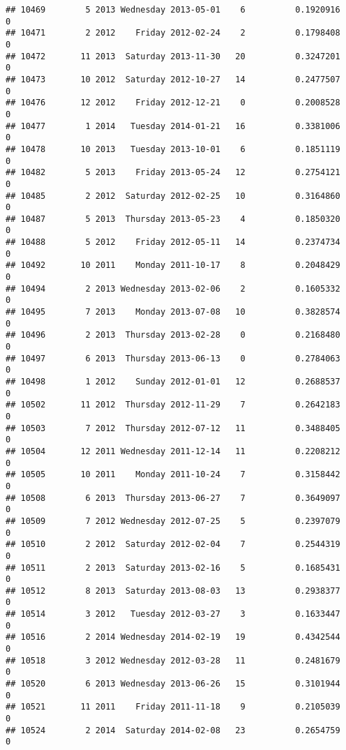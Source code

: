 \documentclass[
]{article}
\begin{document}
\begin{verbatim}
## 10469        5 2013 Wednesday 2013-05-01    6          0.1920916             0
## 10471        2 2012    Friday 2012-02-24    2          0.1798408             0
## 10472       11 2013  Saturday 2013-11-30   20          0.3247201             0
## 10473       10 2012  Saturday 2012-10-27   14          0.2477507             0
## 10476       12 2012    Friday 2012-12-21    0          0.2008528             0
## 10477        1 2014   Tuesday 2014-01-21   16          0.3381006             0
## 10478       10 2013   Tuesday 2013-10-01    6          0.1851119             0
## 10482        5 2013    Friday 2013-05-24   12          0.2754121             0
## 10485        2 2012  Saturday 2012-02-25   10          0.3164860             0
## 10487        5 2013  Thursday 2013-05-23    4          0.1850320             0
## 10488        5 2012    Friday 2012-05-11   14          0.2374734             0
## 10492       10 2011    Monday 2011-10-17    8          0.2048429             0
## 10494        2 2013 Wednesday 2013-02-06    2          0.1605332             0
## 10495        7 2013    Monday 2013-07-08   10          0.3828574             0
## 10496        2 2013  Thursday 2013-02-28    0          0.2168480             0
## 10497        6 2013  Thursday 2013-06-13    0          0.2784063             0
## 10498        1 2012    Sunday 2012-01-01   12          0.2688537             0
## 10502       11 2012  Thursday 2012-11-29    7          0.2642183             0
## 10503        7 2012  Thursday 2012-07-12   11          0.3488405             0
## 10504       12 2011 Wednesday 2011-12-14   11          0.2208212             0
## 10505       10 2011    Monday 2011-10-24    7          0.3158442             0
## 10508        6 2013  Thursday 2013-06-27    7          0.3649097             0
## 10509        7 2012 Wednesday 2012-07-25    5          0.2397079             0
## 10510        2 2012  Saturday 2012-02-04    7          0.2544319             0
## 10511        2 2013  Saturday 2013-02-16    5          0.1685431             0
## 10512        8 2013  Saturday 2013-08-03   13          0.2938377             0
## 10514        3 2012   Tuesday 2012-03-27    3          0.1633447             0
## 10516        2 2014 Wednesday 2014-02-19   19          0.4342544             0
## 10518        3 2012 Wednesday 2012-03-28   11          0.2481679             0
## 10520        6 2013 Wednesday 2013-06-26   15          0.3101944             0
## 10521       11 2011    Friday 2011-11-18    9          0.2105039             0
## 10524        2 2014  Saturday 2014-02-08   23          0.2654759             0

\end{verbatim}
\end{document}
